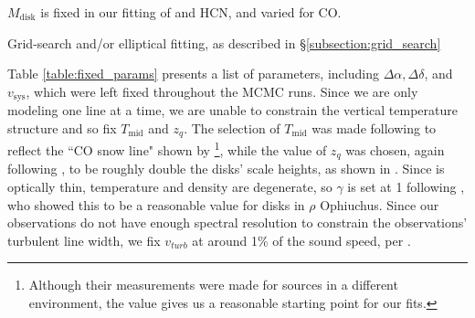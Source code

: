 \begin{table}[h!]
\begin{threeparttable}
    \begin{tablenotes}\footnotesize
      \item[*] $M_\text{disk}$ is fixed in our fitting of \hco{} and HCN, and varied for CO.
      \item[0] Grid-search and/or elliptical fitting, as described in \S\ref{subsection:grid_search}
      \item[1] \citet{Williams2014}
      \item[2] \citet{Flaherty2015}
      \item[3] \citet{GaiaCollaboration2018}
      \item[4] \citet{Andrews2009}
      \item[5] \citet{Factor2017}
      \item[6] \citet{Qi2011}
    \end{tablenotes}
  \end{threeparttable}
\end{table}

Table \ref{table:fixed_params} presents a list of parameters, including $\Delta \alpha, \Delta \delta$, and $v_\text{sys}$, which were left fixed throughout the MCMC runs. Since we are only modeling one line at a time, we are unable to constrain the vertical temperature structure and so fix $T_\text{mid}$ and $z_q$. The selection of $T_\text{mid}$ was made following \citet{Factor2017} to reflect the ``CO snow line" shown by \citet{Qi2011}\footnote{Although their measurements were made for sources in a different environment, the value gives us a reasonable starting point for our fits.}, while the value of $z_q$ was chosen, again following \citet{Factor2017}, to be roughly double the disks' scale heights, as shown in \citet{Rosenfeld2013}. Since \hco{} is optically thin, temperature and density are degenerate, so $\gamma$ is set at 1 following \cite{Andrews2009}, who showed this to be a reasonable value for disks in $\rho$ Ophiuchus. Since our observations do not have enough spectral resolution to constrain the observations' turbulent line width, we fix $v_{turb}$ at around 1\% of the sound speed, per \citet{Flaherty2015}.


